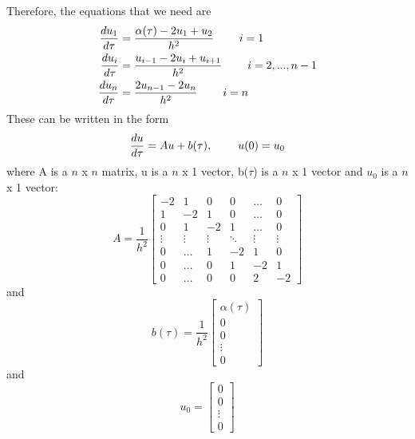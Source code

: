 \documentclass{article}
\begin{document}
\noindent
Therefore, the equations that we need are
\begin{equation*}
\begin{split}
    \frac{d u_1}{d\tau} &= \frac{\alpha(\tau) - 2u_1 + u_{2}}{h^2}  \hspace{0.8cm} i = 1 \\
    \frac{d u_i}{d\tau} &= \frac{u_{i-1} - 2u_i + u_{i+1}}{h^2}  \hspace{0.8cm} i = 2, ..., n-1    \\
    \frac{d u_n}{d\tau} &= \frac{2u_{n-1} - 2u_n}{h^2}  \hspace{0.8cm} i = n
\end{split}
\end{equation*}
These can be written in the form
\begin{equation*}
    \frac{d u}{d \tau} = Au + b(\tau), \hspace{0.8cm} u(0) = u_0
\end{equation*}
where A is a $n$ x $n$ matrix, u is a $n$ x 1 vector, b($\tau$) is a $n$ x 1 vector and $u_0$ is a $n$ x 1 vector:
\begin{equation*}
    A = \frac{1}{h^2} 
\begin{bmatrix}
    -2     &  1     &  0     &  0     & \dots  &  0     \\
    1      & -2     &  1     &  0     & \dots  &  0     \\
    0      &  1     & -2     &  1     & \dots  &  0     \\
    \vdots & \vdots & \vdots & \ddots & \vdots & \vdots \\
    0      & \dots  &  1     & -2     &  1     &  0     \\
    0      & \dots  &  0     &  1     & -2     &  1     \\
    0      & \dots  &  0     &  0     &  2     & -2
\end{bmatrix}
\end{equation*}
and
\begin{equation*}
  b(\tau) = \frac{1}{h^2} 
  \begin{bmatrix}
    \alpha(\tau) \\
    0                        \\
    0                        \\
    \vdots                   \\
    0
  \end{bmatrix}
\end{equation*}
and
\begin{equation*}
  u_0 =
  \begin{bmatrix}
    0      \\
    0      \\
    \vdots \\
    0
  \end{bmatrix}
\end{equation*}
\end{document}
